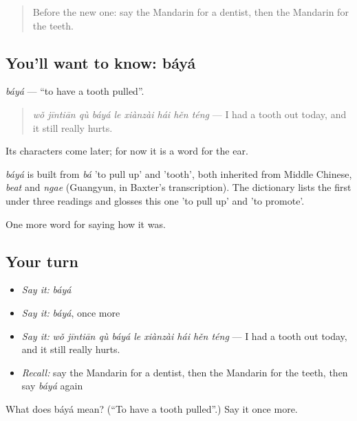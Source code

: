 \label{lesson:ZH-C473-baya}



\begin{quote}
Before the new one: say the Mandarin for a dentist, then the Mandarin for the teeth.
\end{quote}

\subsection*{You'll want to know: báyá}
\emph{báyá} — \textquotedblleft{}to have a tooth pulled\textquotedblright{}.

\begin{quote}
\emph{wǒ jīntiān qù báyá le xiànzài hái hěn téng} — I had a tooth out today, and it still really hurts.
\end{quote}

Its characters come later; for now it is a word for the ear.

\begin{cousinweb}
\emph{báyá} is built from \emph{bá} 'to pull up' and  'tooth', both inherited from Middle Chinese, \emph{beat} and \emph{ngae} (Guangyun, in Baxter's transcription). The dictionary lists the first under three readings and glosses this one 'to pull up' and 'to promote'.
\end{cousinweb}

\begin{grammarlens}[title={What you've built}]
One more word for saying how it was.
\end{grammarlens}

\subsection*{Your turn}
\begin{itemize}
\raggedright
  \item \emph{Say it:} \emph{báyá}
  \item \emph{Say it:} \emph{báyá}, once more
  \item \emph{Say it:} \emph{wǒ jīntiān qù báyá le xiànzài hái hěn téng} — I had a tooth out today, and it still really hurts.
  \item \emph{Recall:} say the Mandarin for a dentist, then the Mandarin for the teeth, then say \emph{báyá} again
\end{itemize}

\begin{tcolorbox}[breakable,colback=teal!4,colframe=teal!35!black,title={Before you move on}]
What does báyá mean? (\textquotedblleft{}To have a tooth pulled\textquotedblright{}.) Say it once more.
\end{tcolorbox}
